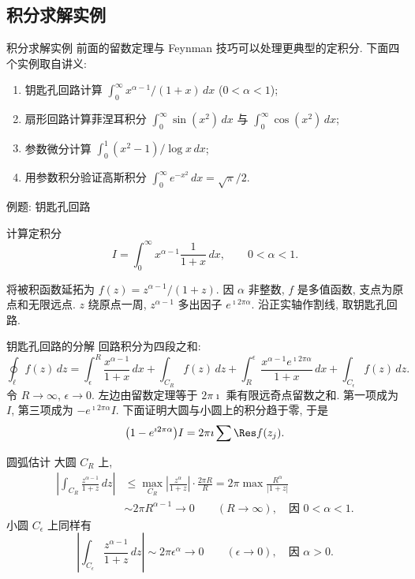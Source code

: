 \documentclass[fontset=windows, chinese, 10pt]{beamer}
\begin{document}
\subsection{积分求解实例}

\begin{frame}{积分求解实例}
\small
前面的留数定理与 Feynman 技巧可以处理更典型的定积分. 下面四个实例取自讲义:
\begin{enumerate}
    \item 钥匙孔回路计算 $\displaystyle\int_0^{\infty} x^{\alpha-1}/(1+x)\,dx$ ($0<\alpha<1$);
    \item 扇形回路计算菲涅耳积分 $\displaystyle\int_0^{\infty}\sin(x^2)\,dx$ 与 $\displaystyle\int_0^{\infty}\cos(x^2)\,dx$;
    \item 参数微分计算 $\displaystyle\int_0^1 (x^2-1)/\log x\,dx$;
    \item 用参数积分验证高斯积分 $\displaystyle\int_0^{\infty} e^{-x^2}\,dx=\sqrt{\pi}/2$.
\end{enumerate}
\end{frame}

\begin{frame}{例题: 钥匙孔回路}
\small
\begin{example}
计算定积分
\[
I=\int_0^{\infty} x^{\alpha-1}\frac{1}{1+x}\,dx,\qquad 0<\alpha<1.
\]
\end{example}
将被积函数延拓为 $f(z)=z^{\alpha-1}/(1+z)$. 因 $\alpha$ 非整数, $f$ 是多值函数, 支点为原点和无限远点. $z$ 绕原点一周, $z^{\alpha-1}$ 多出因子 $e^{\imath 2\pi\alpha}$. 沿正实轴作割线, 取钥匙孔回路.
\begin{center}
\scalebox{0.58}{}
\end{center}
\end{frame}

\begin{frame}{钥匙孔回路的分解}
\small
回路积分为四段之和:
\[
\oint_\ell f(z)\,dz
=\int_{\epsilon}^{R}\frac{x^{\alpha-1}}{1+x}\,dx
+\int_{C_R}f(z)\,dz
+\int_{R}^{\epsilon}\frac{x^{\alpha-1}e^{\imath 2\pi\alpha}}{1+x}\,dx
+\int_{C_\epsilon}f(z)\,dz.
\]
令 $R\to\infty$, $\epsilon\to 0$. 左边由留数定理等于 $2\pi\imath$ 乘有限远奇点留数之和. 第一项成为 $I$, 第三项成为 $-e^{\imath 2\pi\alpha}I$. 下面证明大圆与小圆上的积分趋于零, 于是
\[
\bigl(1-e^{\imath 2\pi\alpha}\bigr)I
=2\pi\imath\sum \Res f(z_j).
\]
\end{frame}

\begin{frame}{圆弧估计}
\small
大圆 $C_R$ 上,
\[
\begin{aligned}
\left|\int_{C_R}\frac{z^{\alpha-1}}{1+z}\,dz\right|
&\leqslant \max_{C_R}\left|\frac{z^{\alpha}}{1+z}\right|\cdot\frac{2\pi R}{R}
=2\pi\max\frac{R^{\alpha}}{|1+z|}\\
&\sim 2\pi R^{\alpha-1}\to 0 \qquad(R\to\infty),\quad\text{因 }0<\alpha<1.
\end{aligned}
\]
小圆 $C_\epsilon$ 上同样有
\[
\left|\int_{C_\epsilon}\frac{z^{\alpha-1}}{1+z}\,dz\right|
\sim 2\pi\epsilon^{\alpha}\to 0 \qquad(\epsilon\to 0),\quad\text{因 }\alpha>0.
\]
\end{frame}
\end{document}
